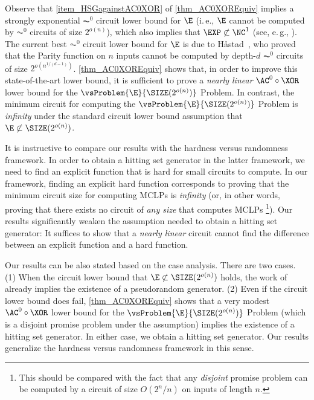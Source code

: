 \documentclass[11pt]{article}
\numberwithin{equation}{section}
\theoremstyle{definition}
\theoremstyle{plain}
\newcommand{\ie}{i.\,e.}
\newcommand{\eg}{e.\,g.}
\begin{document}
Observe that \cref{item_HSGagainstAC0XOR} of \cref{thm_AC0XOREquiv} implies
a strongly exponential $\AC^0$ circuit lower bound for $\E$
(\ie, $\E$ cannot be computed by $\AC^0$ circuits of size $2^{o(n)}$),
which also implies that $\EXP \not \subset \NC^1$ (see, \eg, \cite{AllenderHMPS08_siamcomp_journals,OliveiraS18_focs_conf,GoldreichW13_eccc_journals}).
The current best $\AC^0$ circuit lower bound for $\E$ is due to H{\aa}stad~\cite{Hastad87_PhD_Thesis},
who proved that the Parity function on $n$ inputs cannot be computed by depth-$d$ $\AC^0$ circuits
of size $2^{o(n^{1 / (d-1)})}$.
%
\cref{thm_AC0XOREquiv} shows that, in order to improve this state-of-the-art lower bound,
it is sufficient to prove a \emph{nearly linear} $\AC^0 \circ \XOR$ lower bound for
the $\vsProblem{\E}{\SIZE(2^{o(n)})}$ Problem.
In contrast,
the minimum circuit for computing
the $\vsProblem{\E}{\SIZE(2^{o(n)})}$ Problem
is \emph{infinity}
under the standard circuit lower bound assumption that $\E \not\subset \SIZE(2^{o(n)})$.

It is instructive to compare our results with the hardness versus randomness framework.
In order to obtain a hitting set generator
in the latter framework, we need to find an explicit function that
is hard for small circuits to compute.
In our framework,
finding an explicit hard function
corresponds to proving that the minimum circuit size for computing MCLPs is \emph{infinity}
(or, in other words, proving that there exists no circuit of \emph{any size} that computes MCLPs%
\footnote{
  This should be compared with the fact that
  any \emph{disjoint} promise problem can be computed by a circuit of size $O(2^n / n)$
  on inputs of length $n$.
}).
Our results significantly weaken the assumption needed to obtain a hitting set generator:
It suffices to show that a \emph{nearly linear} circuit
cannot find the difference between an explicit function and a hard function.

Our results can be also stated based on the case analysis.
There are two cases.
(1) When the circuit lower bound that $\E \not\subset \SIZE(2^{o(n)})$ holds,
the work of \cite{ImpagliazzoW97_stoc_conf} already implies the existence of a pseudorandom generator.
(2) Even if the circuit lower bound does fail,
\cref{thm_AC0XOREquiv} shows that
a very modest $\AC^0 \circ \XOR$ lower bound for the $\vsProblem{\E}{\SIZE(2^{o(n)})}$ Problem
(which is a disjoint promise problem under the assumption) implies
the existence of a hitting set generator.
In either case, we obtain a hitting set generator.
Our results generalize the hardness versus randomness framework in this sense.
\end{document}
